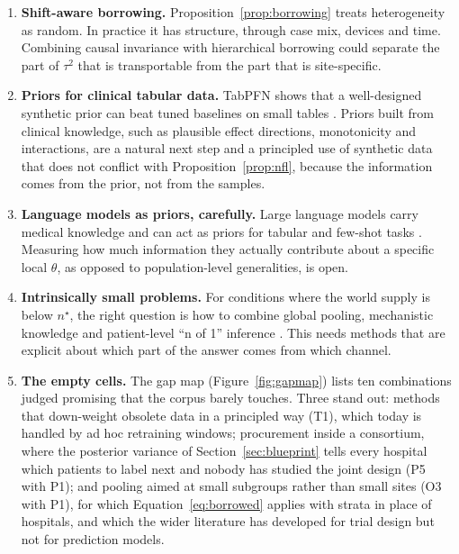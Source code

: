 \documentclass[acmsmall,screen,review]{acmart}
\theoremstyle{acmdefinition}
\begin{document}
\begin{enumerate}[leftmargin=*,itemsep=3pt]
\item \textbf{Shift-aware borrowing.} Proposition~\ref{prop:borrowing} treats heterogeneity as random. In practice it has structure, through case mix, devices and time. Combining causal invariance \cite{arjovsky2019invariant,castro2020causality} with hierarchical borrowing could separate the part of $\tau^2$ that is transportable from the part that is site-specific.
\item \textbf{Priors for clinical tabular data.} TabPFN shows that a well-designed synthetic prior can beat tuned baselines on small tables \cite{hollmann2025accurate}. Priors built from clinical knowledge, such as plausible effect directions, monotonicity and interactions, are a natural next step and a principled use of synthetic data that does not conflict with Proposition~\ref{prop:nfl}, because the information comes from the prior, not from the samples.
\item \textbf{Language models as priors, carefully.} Large language models carry medical knowledge \cite{singhal2023large} and can act as priors for tabular and few-shot tasks \cite{hegselmann2023tabllm}. Measuring how much information they actually contribute about a specific local $\theta$, as opposed to population-level generalities, is open.
\item \textbf{Intrinsically small problems.} For conditions where the world supply is below $n^{\star}$, the right question is how to combine global pooling, mechanistic knowledge and patient-level ``n of 1'' inference \cite{estrin2014small,hekler2019we}. This needs methods that are explicit about which part of the answer comes from which channel.
\item \textbf{The empty cells.} The gap map (Figure~\ref{fig:gapmap}) lists ten combinations judged promising that the corpus barely touches. Three stand out: methods that down-weight obsolete data in a principled way (T1), which today is handled by ad hoc retraining windows; procurement inside a consortium, where the posterior variance of Section~\ref{sec:blueprint} tells every hospital which patients to label next and nobody has studied the joint design (P5 with P1); and pooling aimed at small subgroups rather than small sites (O3 with P1), for which Equation~\eqref{eq:borrowed} applies with strata in place of hospitals, and which the wider literature has developed for trial design but not for prediction models.
\end{enumerate}

\end{document}
